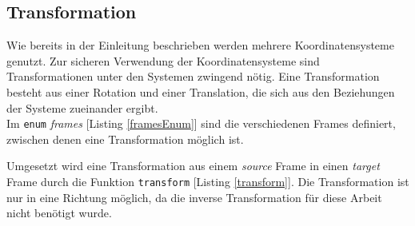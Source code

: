 \subsection{Transformation}
\label{sec_transformations}
Wie bereits in der Einleitung beschrieben werden mehrere Koordinatensysteme genutzt. Zur sicheren Verwendung der Koordinatensysteme sind Transformationen unter den Systemen zwingend nötig.
Eine Transformation besteht aus einer Rotation und einer Translation, die sich aus den Beziehungen der Systeme zueinander ergibt.\\
Im \texttt{enum} \textit{frames} [Listing \ref{framesEnum}] sind die verschiedenen Frames definiert, zwischen denen eine Transformation möglich ist.



Umgesetzt wird eine Transformation aus einem \textit{source} Frame in einen \textit{target} Frame durch die Funktion \texttt{transform} [Listing \ref{transform}]. Die Transformation ist nur in eine Richtung möglich, da die inverse Transformation für diese Arbeit nicht benötigt wurde.




